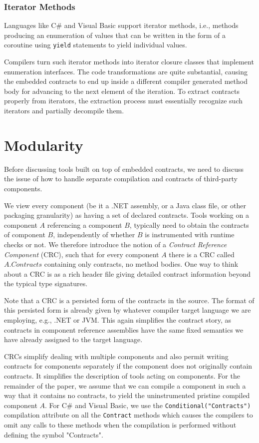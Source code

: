 \documentclass{sig-alternate}
\newcommand{\csharp}{C\#}
\newcommand{\code}[1]{\lstinline{#1}}
\begin{document}
\subsubsection{Iterator Methods}
\noindent
Languages like \csharp{} and Visual Basic support iterator methods,
i.e., methods producing an enumeration of values that can be written
in the form of a coroutine using \lstinline{yield} statements to yield
individual values.

Compilers turn such iterator methods into iterator closure classes that
implement enumeration interfaces. The code transformations are quite
substantial, causing the embedded contracts to end up inside a
different compiler generated method
body for advancing to the next element of the iteration. To extract
contracts properly from iterators, the extraction process must
essentially recognize such iterators and partially decompile them.

\section{Modularity}
\noindent
Before discussing tools built on top of embedded contracts, we need to
discuss the issue of how to handle separate compilation and contracts
of third-party components.

We view every component (be it a .NET assembly, or a Java class file,
or other packaging granularity) as having a set of declared
contracts. Tools working on a component $A$ referencing a component
$B$, typically need to obtain the contracts of component $B$,
independently of whether $B$ is instrumented with runtime checks or
not. We therefore introduce the notion of a \emph{Contract Reference
 Component} (CRC), such that for every component $A$ there is a CRC
called $A.Contracts$ containing only contracts, no method bodies.
One way to think about a CRC is as a rich header file giving detailed
contract information beyond the typical type signatures.

Note that a CRC is a persisted form of the contracts in the
source. The format of this persisted form is already given by whatever
compiler target language we are employing, e.g., .NET or JVM. This
again simplifies the contract story, as contracts in component
reference assemblies have the same fixed semantics we have already
assigned to the target language.

CRCs simplify dealing with multiple components and also permit
writing contracts for components separately if the component does not
originally contain contracts. It simplifies the description of
tools acting on components. For the remainder of the paper, we assume
that we can compile a component in such a way that it contains no
contracts, to yield the uninstrumented pristine compiled component $A$. For
\csharp{} and Visual Basic, we use the \code{Conditional("Contracts")} compilation
attribute on all the \code{Contract} methods which causes the
compilers to omit any calls to these methods when the compilation is
performed without defining the symbol "Contracts".
\end{document}

